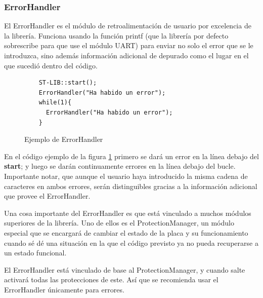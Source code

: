 \documentclass{report}
\begin{document}
\subsubsection{ErrorHandler}
El ErrorHandler es el módulo de retroalimentación de usuario por excelencia de la librería. Funciona usando la función printf (que la librería por defecto sobrescribe para que use el módulo UART) para enviar no solo el error que se le introduzca, sino además información adicional de depurado como el lugar en el que sucedió dentro del código. 
\begin{figure}[h]
  \begin{lstlisting}
    ST-LIB::start();
    ErrorHandler("Ha habido un error");
    while(1){
      ErrorHandler("Ha habido un error");
    }
  \end{lstlisting}
  \caption{Ejemplo de ErrorHandler}
  \label{ErrorHandlerCode}
\end{figure}
En el código ejemplo de la figura \ref{ErrorHandlerCode} primero se dará un error en la línea debajo del \textbf{start}; y luego se darán continuamente errores en la línea debajo del bucle. Importante notar, que aunque el usuario haya introducido la misma cadena de caracteres en ambos errores, serán distinguibles gracias a la información adicional que provee el ErrorHandler. 
\par \vspace{0.3cm}
Una cosa importante del ErrorHandler es que está vinculado a muchos módulos superiores de la librería. Uno de ellos es el ProtectionManager, un módulo especial que se encargará de cambiar el estado de la placa y su funcionamiento cuando sé dé una situación en la que el código previsto ya no pueda recuperarse a un estado funcional. 
\par
El ErrorHandler está vinculado de base al ProtectionManager, y cuando salte activará todas las protecciones de este. Así que se recomienda usar el ErrorHandler únicamente para errores. 
\end{document}

